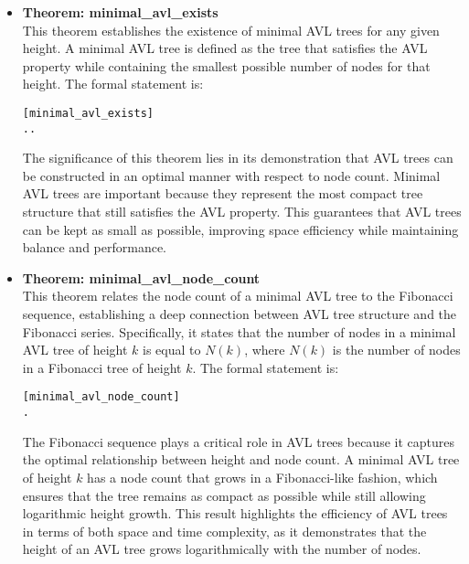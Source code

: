 \documentclass[12pt]{article}
\begin{document}
\begin{itemize}
  \item \textbf{Theorem: minimal\_avl\_exists} \\
  This theorem establishes the existence of minimal AVL trees for any given height. A minimal AVL tree is defined as the tree that satisfies the AVL property while containing the smallest possible number of nodes for that height. The formal statement is:

\begin{alltt}
[minimal_avl_exists]
\HOLTokenTurnstile{} \HOLSymConst{\HOLTokenForall{}}. \HOLSymConst{\HOLTokenExists{}}.   \HOLSymConst{\HOLTokenConj{}}   \HOLSymConst{=} 
\end{alltt}

  The significance of this theorem lies in its demonstration that AVL trees can be constructed in an optimal manner with respect to node count. Minimal AVL trees are important because they represent the most compact tree structure that still satisfies the AVL property. This guarantees that AVL trees can be kept as small as possible, improving space efficiency while maintaining balance and performance.

  \item \textbf{Theorem: minimal\_avl\_node\_count} \\
  This theorem relates the node count of a minimal AVL tree to the Fibonacci sequence, establishing a deep connection between AVL tree structure and the Fibonacci series. Specifically, it states that the number of nodes in a minimal AVL tree of height \( k \) is equal to \( N(k) \), where \( N(k) \) is the number of nodes in a Fibonacci tree of height \( k \). The formal statement is:

\begin{alltt}
[minimal_avl_node_count]
\HOLTokenTurnstile{} \HOLSymConst{\HOLTokenForall{}} .   \HOLSymConst{\HOLTokenConj{}}   \HOLSymConst{=}  \HOLSymConst{\HOLTokenImp{}}   \HOLSymConst{=}  
\end{alltt}

  The Fibonacci sequence plays a critical role in AVL trees because it captures the optimal relationship between height and node count. A minimal AVL tree of height \( k \) has a node count that grows in a Fibonacci-like fashion, which ensures that the tree remains as compact as possible while still allowing logarithmic height growth. This result highlights the efficiency of AVL trees in terms of both space and time complexity, as it demonstrates that the height of an AVL tree grows logarithmically with the number of nodes.


\end{itemize}
\end{document}
